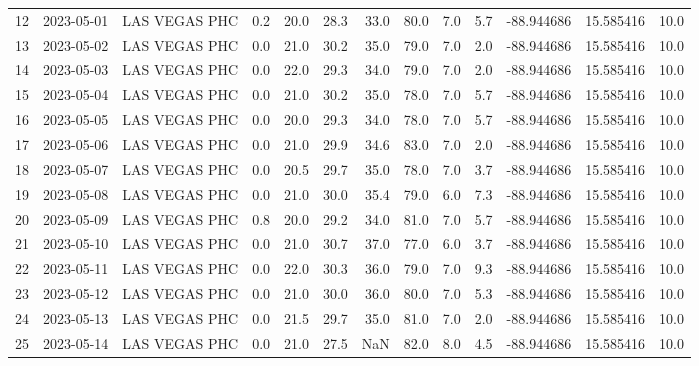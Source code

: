 \documentclass[12pt]{article}
\begin{document}
\begin{center}
\begin{tabular}{lllrrrrrrrrrr}
12  & 2023-05-01 &  LAS VEGAS PHC &     0.2 &  20.0 &   28.3 &  33.0 &     80.0 &  7.0 &         5.7 & -88.944686 &  15.585416 &     10.0 \\
13  & 2023-05-02 &  LAS VEGAS PHC &     0.0 &  21.0 &   30.2 &  35.0 &     79.0 &  7.0 &         2.0 & -88.944686 &  15.585416 &     10.0 \\
14  & 2023-05-03 &  LAS VEGAS PHC &     0.0 &  22.0 &   29.3 &  34.0 &     79.0 &  7.0 &         2.0 & -88.944686 &  15.585416 &     10.0 \\
15  & 2023-05-04 &  LAS VEGAS PHC &     0.0 &  21.0 &   30.2 &  35.0 &     78.0 &  7.0 &         5.7 & -88.944686 &  15.585416 &     10.0 \\
16  & 2023-05-05 &  LAS VEGAS PHC &     0.0 &  20.0 &   29.3 &  34.0 &     78.0 &  7.0 &         5.7 & -88.944686 &  15.585416 &     10.0 \\
17  & 2023-05-06 &  LAS VEGAS PHC &     0.0 &  21.0 &   29.9 &  34.6 &     83.0 &  7.0 &         2.0 & -88.944686 &  15.585416 &     10.0 \\
18  & 2023-05-07 &  LAS VEGAS PHC &     0.0 &  20.5 &   29.7 &  35.0 &     78.0 &  7.0 &         3.7 & -88.944686 &  15.585416 &     10.0 \\
19  & 2023-05-08 &  LAS VEGAS PHC &     0.0 &  21.0 &   30.0 &  35.4 &     79.0 &  6.0 &         7.3 & -88.944686 &  15.585416 &     10.0 \\
20  & 2023-05-09 &  LAS VEGAS PHC &     0.8 &  20.0 &   29.2 &  34.0 &     81.0 &  7.0 &         5.7 & -88.944686 &  15.585416 &     10.0 \\
21  & 2023-05-10 &  LAS VEGAS PHC &     0.0 &  21.0 &   30.7 &  37.0 &     77.0 &  6.0 &         3.7 & -88.944686 &  15.585416 &     10.0 \\
22  & 2023-05-11 &  LAS VEGAS PHC &     0.0 &  22.0 &   30.3 &  36.0 &     79.0 &  7.0 &         9.3 & -88.944686 &  15.585416 &     10.0 \\
23  & 2023-05-12 &  LAS VEGAS PHC &     0.0 &  21.0 &   30.0 &  36.0 &     80.0 &  7.0 &         5.3 & -88.944686 &  15.585416 &     10.0 \\
24  & 2023-05-13 &  LAS VEGAS PHC &     0.0 &  21.5 &   29.7 &  35.0 &     81.0 &  7.0 &         2.0 & -88.944686 &  15.585416 &     10.0 \\
25  & 2023-05-14 &  LAS VEGAS PHC &     0.0 &  21.0 &   27.5 &   NaN &     82.0 &  8.0 &         4.5 & -88.944686 &  15.585416 &     10.0 \\
\bottomrule
\end{tabular}

        
        \end{center}
        
\end{document}
